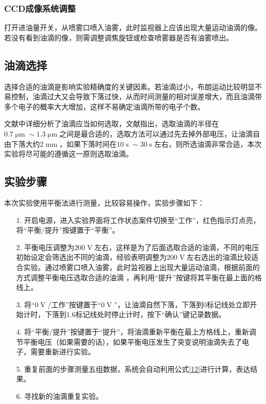 \documentclass{WHUReport}
\begin{document}
\begin{multicols}{2}
	\subsubsection{CCD成像系统调整}
	打开进油量开关，从喷雾口喷入油雾，此时监视器上应该出现大量运动油滴的像。若没有看到油滴的像，则需调整调焦旋钮或检查喷雾器是否有油雾喷出。
	\subsection{油滴选择}
	选择合适的油滴是影响实验精确度的关键因素。若油滴过小，布朗运动比较明显不易控制，油滴过大又会导致下落过快，从而时间测量的相对误差增大，而且油滴带多个电子的概率大大增加，这样不易确定油滴所带的电子个数。
	
	文献\cite{ref4}中详细分析了油滴应当如何选取，文献指出，选取油滴的半径在$0.7\operatorname{\mu m}\sim 1.3\operatorname{\mu m}$之间是最合适的，选取方法可以通过先去掉外部电压，让油滴自由下落大约$2\operatorname{mm}$，如果下落时间在$10\operatorname{s}\sim 30\operatorname{s}$左右，则所选油滴非常合适，本次实验将尽可能的遵循这一原则选取油滴。
	\subsection{实验步骤}
	本次实验使用平衡法进行测量，比较容易操作，实验步骤如下：
	\begin{itemize}
		\item[1.] 开启电源，进入实验界面将工作状态案件切换至“工作”，红色指示灯点亮，将“平衡/提升”按键置于“平衡”。
		\item[2.] 平衡电压调整为$200\operatorname{V}$左右，这样是为了后面选取合适的油滴，不同的电压初始设定会筛选出不同的油滴，经验表明调整为$200\operatorname{V}$左右选出的油滴比较适合实验。通过喷雾口喷入油雾，此时监视器上出现大量运动油滴，根据前面的方式调整平衡电压选取合适的油滴 ，再利用“提升”按键将其平衡在最上面的格线上。
		\item[3.] 将“$0\operatorname{V}$/工作”按键置于“$0\operatorname{V}$”，让油滴自然下落，下落到$0$标记线处立即开始计时，下落到$1.6$标记线处时停止计时，按下“确认”键记录数据。
		\item[4.] 将“平衡/提升”按键置于“提升”，将油滴重新平衡在最上方格线上，重新调节平衡电压（如果需要的话），如果平衡电压发生了突变说明油滴失去了电子，需要重新进行实验。
		\item[5.] 重复前面的步骤测量五组数据，系统会自动利用公式\ref{12}进行计算，表达结果。
		\item[6.] 寻找新的油滴重复实验。
	\end{itemize}

\end{multicols}
\end{document}
